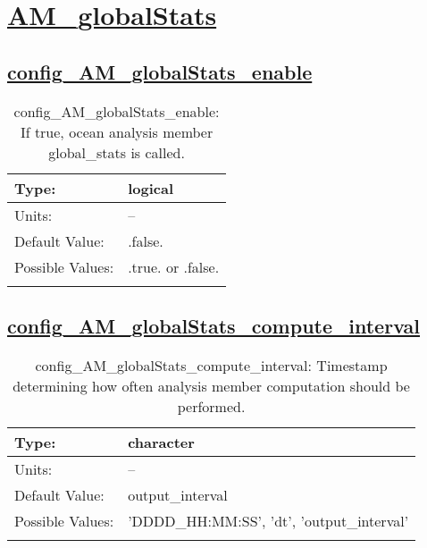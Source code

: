 \section[AM\_globalStats]{\hyperref[sec:nm_tab_AM_globalStats]{AM\_globalStats}}
\label{sec:nm_sec_AM_globalStats}
\subsection[config\_AM\_globalStats\_enable]{\hyperref[sec:nm_tab_AM_globalStats]{config\_AM\_globalStats\_enable}}
\label{subsec:nm_sec_config_AM_globalStats_enable}
\begin{center}
\begin{longtable}{| p{2.0in} || p{4.0in} |}
    \hline
    Type: & logical \\
    \hline
    Units: & -- \\
    \hline
    Default Value: & .false. \\
    \hline
    Possible Values: & .true. or .false. \\
    \hline
    \caption{config\_AM\_globalStats\_enable: If true, ocean analysis member global\_stats is called.}
\end{longtable}
\end{center}
\subsection[config\_AM\_globalStats\_compute\_interval]{\hyperref[sec:nm_tab_AM_globalStats]{config\_AM\_globalStats\_compute\_interval}}
\label{subsec:nm_sec_config_AM_globalStats_compute_interval}
\begin{center}
\begin{longtable}{| p{2.0in} || p{4.0in} |}
    \hline
    Type: & character \\
    \hline
    Units: & -- \\
    \hline
    Default Value: & output\_interval \\
    \hline
    Possible Values: & 'DDDD\_HH:MM:SS', 'dt', 'output\_interval' \\
    \hline
    \caption{config\_AM\_globalStats\_compute\_interval: Timestamp determining how often analysis member computation should be performed.}
\end{longtable}
\end{center}

